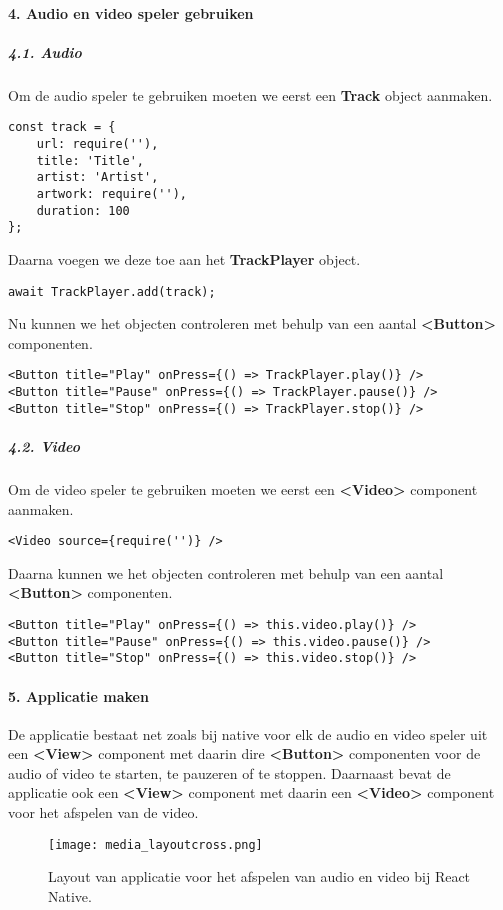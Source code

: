 \paragraph{4. Audio en video speler gebruiken}
\subparagraph{4.1. Audio}
Om de audio speler te gebruiken moeten we eerst een \textbf{Track} object aanmaken.
\begin{verbatim}
const track = {
    url: require(''),
    title: 'Title',
    artist: 'Artist',
    artwork: require(''),
    duration: 100
};
\end{verbatim}
Daarna voegen we deze toe aan het \textbf{TrackPlayer} object.
\begin{verbatim}
await TrackPlayer.add(track);
\end{verbatim}
Nu kunnen we het objecten controleren met behulp van een aantal \textbf{<Button>} componenten.
\begin{verbatim}
<Button title="Play" onPress={() => TrackPlayer.play()} />
<Button title="Pause" onPress={() => TrackPlayer.pause()} />
<Button title="Stop" onPress={() => TrackPlayer.stop()} />
\end{verbatim}

\subparagraph{4.2. Video}
Om de video speler te gebruiken moeten we eerst een \textbf{<Video>} component aanmaken.
\begin{verbatim}
<Video source={require('')} />
\end{verbatim}
Daarna kunnen we het objecten controleren met behulp van een aantal \textbf{<Button>} componenten.
\begin{verbatim}
<Button title="Play" onPress={() => this.video.play()} />
<Button title="Pause" onPress={() => this.video.pause()} />
<Button title="Stop" onPress={() => this.video.stop()} />
\end{verbatim}

\paragraph{5. Applicatie maken}
De applicatie bestaat net zoals bij native voor elk de audio en video speler uit een \textbf{<View>}
component met daarin dire \textbf{<Button>} componenten voor de audio of video te starten, te pauzeren
of te stoppen. Daarnaast bevat de applicatie ook een \textbf{<View>} component met daarin een
\textbf{<Video>} component voor het afspelen van de video.
\begin{figure}[H]
    \centering
    \texttt{[image: media\_layoutcross.png]}
    \caption{Layout van applicatie voor het afspelen van audio en video bij React Native.}
\end{figure}


